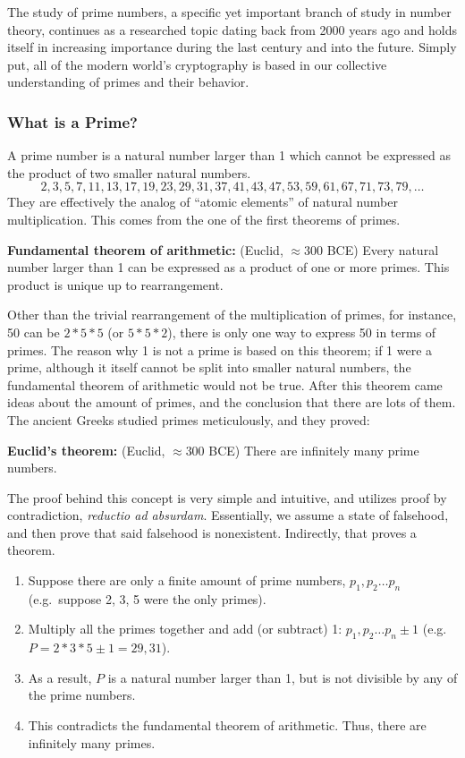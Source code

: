 
The study of prime numbers, a specific yet important branch of study in number theory, continues as a researched topic dating back from 2000 years ago and holds itself in increasing importance during the last century and into the future. Simply put, all of the modern world’s cryptography is based in our collective understanding of primes and their behavior. 

\subsubsection*{What is a Prime?}

A prime number is a natural number larger than 1 which cannot be expressed as the product of two smaller natural numbers. 
\[2, 3, 5, 7, 11, 13, 17, 19, 23, 29, 31, 37, 41, 43, 47, 53, 59 ,61, 67, 71, 73, 79, \ldots \]
They are effectively the analog of “atomic elements” of natural number multiplication. This comes from the one of the first theorems of primes.

\textbf{Fundamental theorem of arithmetic:}  (Euclid, \(\approx 300\) BCE) Every natural number larger than 1 can be expressed as a product of one or more primes. This product is unique up to rearrangement.

Other than the trivial rearrangement of the multiplication of primes, for instance, 50 can be \(2 * 5 * 5\) (or \(5 * 5 * 2\)), there is only one way to express 50 in terms of primes. The reason why 1 is not a prime is based on this theorem; if 1 were a prime, although it itself cannot be split into smaller natural numbers, the fundamental theorem of arithmetic would not be true. After this theorem came ideas about the amount of primes, and the conclusion that there are lots of them. The ancient Greeks studied primes meticulously, and they proved:

\textbf{Euclid’s theorem:} (Euclid, \(\approx 300\) BCE) There are infinitely many prime numbers.

The proof behind this concept is very simple and intuitive, and utilizes proof by contradiction, \textit{reductio ad absurdam}. Essentially, we assume a state of falsehood, and then prove that said falsehood is nonexistent. Indirectly, that proves a theorem. 

\begin{enumerate}
    \item Suppose there are only a finite amount of prime numbers, \(p_1, p_2 \ldots p_n\) (e.g.\ suppose 2, 3, 5 were the only primes).
    \item Multiply all the primes together and add (or subtract) 1: \(p_1, p_2 \ldots p_n \pm 1\) (e.g. \(P = 2 * 3 * 5 \pm 1 = 29, 31\)).
    \item As a result, \(P\) is a natural number larger than 1, but is not divisible by any of the prime numbers.
    \item This contradicts the fundamental theorem of arithmetic. Thus, there are infinitely many primes.
\end{enumerate}

